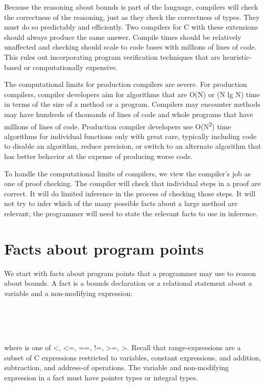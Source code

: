 Because the reasoning about bounds is part of the language, compilers
will check the correctness of the reasoning, just as they check the
correctness of types. They must do so predictably and efficiently. Two
compilers for C with these extensions should always produce the same
answer. Compile times should be relatively unaffected and checking
should scale to code bases with millions of lines of code. This rules
out incorporating program verification techniques that are
heuristic-based or computationally expensive.

The computational limits for production compilers are severe. For
production compilers, compiler developers aim for algorithms that are
O(N) or (N lg N) time in terms of the size of a method or a program.
Compilers may encounter methods may have hundreds of thousands of lines
of code and whole programs that have millions of lines of code.
Production compiler developers use O(N\textsuperscript{2}) time
algorithms for individual functions only with great care, typically
including code to disable an algorithm, reduce precision, or switch to
an alternate algorithm that has better behavior at the expense of
producing worse code.

To handle the computational limits of compilers, we view the compiler's
job as one of proof checking. The compiler will check that individual
steps in a proof are correct. It will do limited inference in the
process of checking those steps. It will not try to infer which of the
many possible facts about a large method are relevant; the programmer
will need to state the relevant facts to use in inference.

\section{Facts about program points}

We start with facts about program points that a programmer may use to
reason about bounds. A fact is a bounds declaration or a relational
statement about a variable and a non-modifying expression:
\begin{tabbing}
\=\\
\> \\
\> \\
\>
\end{tabbing}

where  is one of \textless{}, \textless{}=, ==, !=,
\textgreater{}=, \textgreater{}. Recall that range-expressions are a
subset of C expressions restricted to variables, constant expressions,
and addition, subtraction, and address-of operations. The variable and
non-modifying expression in a fact must have pointer types or integral
types.


